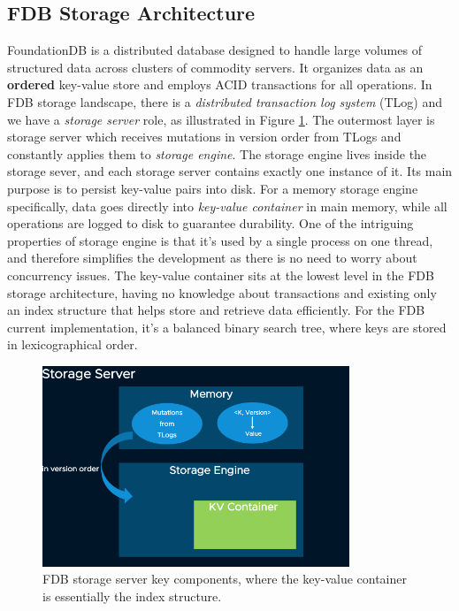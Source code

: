 \documentclass[sigplan,screen,nonacm]{acmart}
\begin{document}
\subsection{FDB Storage Architecture}
FoundationDB \cite{fdb} is a distributed database designed to handle large volumes of structured data across clusters of commodity servers. It organizes data as an \textbf{ordered} key-value store and employs ACID transactions for all operations. In FDB storage landscape, there is a {\itshape distributed transaction log system} (TLog) and we have a {\itshape storage server} role, as illustrated in Figure \ref{fig:FDB-storage-architecture}. The outermost layer is storage server which receives mutations in version order from TLogs and constantly applies them to {\itshape storage engine}. The storage engine lives inside the storage sever, and each storage server contains exactly one instance of it. Its main purpose is to persist key-value pairs into disk. For a memory storage engine specifically, data goes directly into {\itshape key-value container} in main memory, while all operations are logged to disk to guarantee durability. One of the intriguing properties of storage engine is that it’s used by a single process on one thread, and therefore simplifies the development as there is no need to worry about concurrency issues. The key-value container sits at the lowest level in the FDB storage architecture, having no knowledge about transactions and existing only an index structure that helps store and retrieve data efficiently. For the FDB current implementation, it’s a balanced binary search tree, where keys are stored in lexicographical order. 
\begin{figure}[t]
  \centering
  \includegraphics[width=\linewidth, height=6cm]{pic/FDB-storage-architecture.png}
  \setlength{\abovecaptionskip}{-10pt} 
  \setlength{\belowcaptionskip}{-7pt} 
  \caption{FDB storage server key components, where the key-value container is essentially the index structure.}
  \label{fig:FDB-storage-architecture}
\end{figure}
\end{document}
